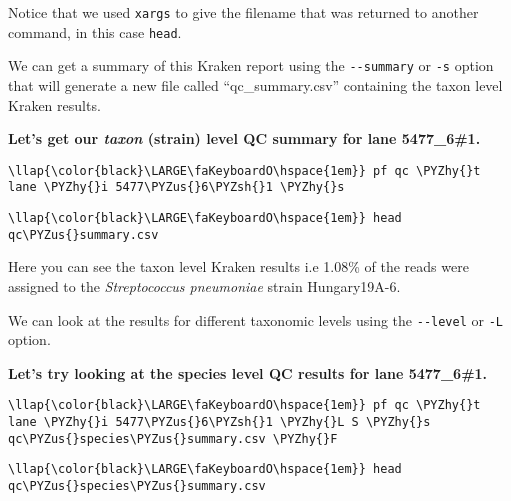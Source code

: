 \documentclass[11pt]{article}
\def\PYZus{\char`\_}
\def\PYZsh{\char`\#}
\def\PYZhy{\char`\-}
\begin{document}
    Notice that we used \texttt{xargs} to give the filename that was
returned to another command, in this case \texttt{head}.

We can get a summary of this Kraken report using the
\texttt{-\/-summary} or \texttt{-s} option that will generate a new file
called ``qc\_summary.csv'' containing the taxon level Kraken results.

\textbf{Let's get our \textit{taxon} (strain) level QC summary for lane
5477\_6\#1.}

\begin{terminalinput}
\begin{Verbatim}[commandchars=\\\{\}]
\llap{\color{black}\LARGE\faKeyboardO\hspace{1em}} pf qc \PYZhy{}t lane \PYZhy{}i 5477\PYZus{}6\PYZsh{}1 \PYZhy{}s
\end{Verbatim}
\end{terminalinput}

\begin{terminalinput}
\begin{Verbatim}[commandchars=\\\{\}]
\llap{\color{black}\LARGE\faKeyboardO\hspace{1em}} head qc\PYZus{}summary.csv
\end{Verbatim}
\end{terminalinput}

    Here you can see the taxon level Kraken results i.e 1.08\% of the reads
were assigned to the \textit{Streptococcus pneumoniae} strain
Hungary19A-6.

We can look at the results for different taxonomic levels using the
\texttt{-\/-level} or \texttt{-L} option.

\textbf{Let's try looking at the species level QC results for lane
5477\_6\#1.}

\begin{terminalinput}
\begin{Verbatim}[commandchars=\\\{\}]
\llap{\color{black}\LARGE\faKeyboardO\hspace{1em}} pf qc \PYZhy{}t lane \PYZhy{}i 5477\PYZus{}6\PYZsh{}1 \PYZhy{}L S \PYZhy{}s qc\PYZus{}species\PYZus{}summary.csv \PYZhy{}F
\end{Verbatim}
\end{terminalinput}

\begin{terminalinput}
\begin{Verbatim}[commandchars=\\\{\}]
\llap{\color{black}\LARGE\faKeyboardO\hspace{1em}} head qc\PYZus{}species\PYZus{}summary.csv
\end{Verbatim}
\end{terminalinput}
\end{document}
